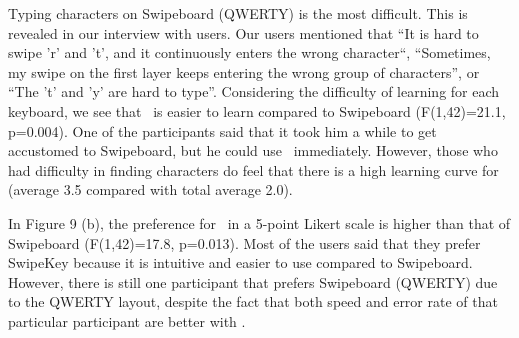 Typing characters on Swipeboard (QWERTY) is the most difficult. This is revealed in our interview with users. Our users mentioned that “It is hard to swipe 'r' and 't', and it continuously enters the wrong character“, “Sometimes, my swipe on the first layer keeps entering the wrong group of characters”, or “The 't' and 'y' are hard to type”. 
Considering the difficulty of learning for each keyboard, we see that \papertitle\ is easier to learn compared to Swipeboard (F(1,42)=21.1,  p=0.004). One of the participants said that it took him a while to get accustomed to Swipeboard, but he could use \papertitle\ immediately. However, those who had difficulty in finding characters do feel that there is a high learning curve for \papertitle (average 3.5 compared with total average 2.0).

In Figure 9 (b), the preference for \papertitle\ in a 5-point Likert scale is higher than that of Swipeboard (F(1,42)=17.8,  p=0.013). Most of the users said that they prefer SwipeKey because it is intuitive and easier to use compared to Swipeboard. However, there is still one participant that prefers Swipeboard (QWERTY) due to the QWERTY layout, despite the fact that both speed and error rate of that particular participant are better with \papertitle.
